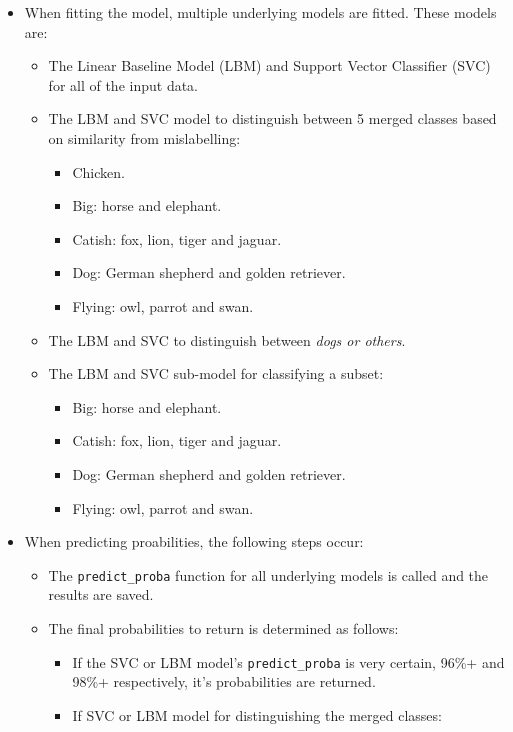 \begin{itemize}
    \item When fitting the model, multiple underlying models are fitted. These models are:
    \begin{itemize}
        \item The Linear Baseline Model (LBM) and Support Vector Classifier (SVC) for all of the input data.
        \item The LBM and SVC model to distinguish between 5 merged classes based on similarity from mislabelling:
        \begin{itemize}
            \item Chicken.
            \item Big: horse and elephant.
            \item Catish: fox, lion, tiger and jaguar.
            \item Dog: German shepherd and golden retriever.
            \item Flying: owl, parrot and swan.
        \end{itemize}
        \item The LBM and SVC to distinguish between \textit{dogs or others}.
        \item The LBM and SVC sub-model for classifying a subset:
        \begin{itemize}
            \item Big: horse and elephant.
            \item Catish: fox, lion, tiger and jaguar.
            \item Dog: German shepherd and golden retriever.
            \item Flying: owl, parrot and swan.
        \end{itemize}
    \end{itemize}
    \item When predicting proabilities, the following steps occur:
    \begin{itemize}
        \item The \texttt{predict\_proba} function for all underlying models is called and the results are saved.
        \item The final probabilities to return is determined as follows:
        \clearpage
        \begin{itemize}
            \item If the SVC or LBM model's \texttt{predict\_proba} is very certain, 96\%+ and 98\%+ respectively, it's probabilities are returned.
            \item If SVC or LBM model for distinguishing the merged classes:

\end{itemize}
\end{itemize}
\end{itemize}
